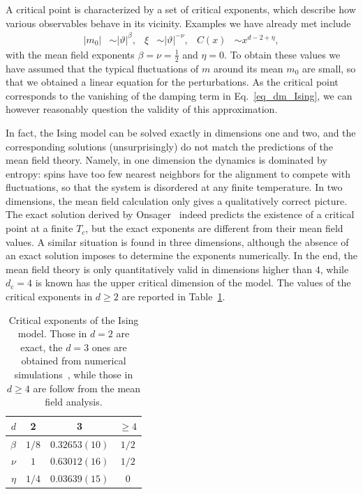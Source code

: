 A critical point is characterized by a set of critical exponents, which describe how various observables behave in its vicinity.
Examples we have already met include
%
\begin{align}
    |m_0| &\sim |\vartheta|^\beta, &
    \xi & \sim |\vartheta|^{-\nu}, &
    C(x) & \sim x^{d - 2 + \eta},
\end{align}
%
with the mean field exponents $\beta = \nu = \tfrac{1}{2}$ and $\eta = 0$.
To obtain these values we have assumed that the typical fluctuations of $m$ around its mean $m_0$ are small, so that we obtained a linear equation for the perturbations.
As the critical point corresponds to the vanishing of the damping term in Eq.~\eqref{eq_dm_Ising}, 
we can however reasonably question the validity of this approximation.

In fact, the Ising model can be solved exactly in dimensions one and two, 
and the corresponding solutions (unsurprisingly) do not match the predictions of the mean field theory.
Namely, in one dimension the dynamics is dominated by entropy: spins have too few nearest neighbors for the alignment to compete with fluctuations, so that the system is disordered at any finite temperature.
In two dimensions, the mean field calculation only gives a qualitatively correct picture. 
The exact solution derived by Onsager~\cite{Onsager1944} indeed predicts the existence of a critical point at a finite $T_c$, but the exact exponents are different from their mean field values.  
A similar situation is found in three dimensions, although the absence of an exact solution imposes to determine the exponents numerically.
In the end, the mean field theory is only quantitatively valid in dimensions higher than $4$, while $d_c = 4$ is known has the upper critical dimension of the model.
The values of the critical exponents in $d \ge 2$ are reported in Table~\ref{table_Ising_exp}.

\begin{table}[!t]
    \centering
    \caption{Critical exponents of the Ising model. Those in $d=2$ are exact, the $d=3$ ones are obtained from numerical simulations~\cite{CampostriniPRE2002}, while those in $d \ge 4$ are follow from the mean field analysis.}
    \begin{tabular}{r|c c c}
        $d$ & 2 & 3 & $\ge 4$ \\
        \hline
        $\beta$ & $1/8$ & $0.32653(10)$ & $1 / 2$ \\
        $\nu$ & $1$ & $0.63012(16)$ & $1 / 2$ \\
        $\eta$ & $1/4$ & $0.03639(15)$ & $0$
    \end{tabular}   
    \label{table_Ising_exp}
\end{table}

